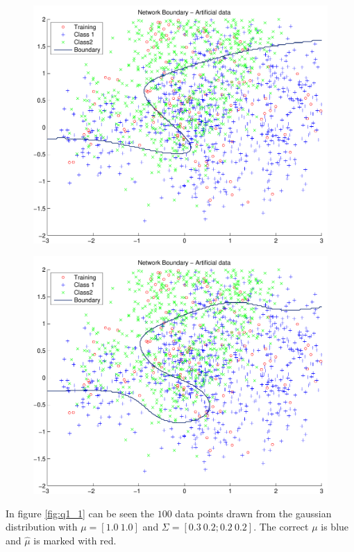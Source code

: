 \begin{figure}[!htbp]
  \centering
  \includegraphics[width=1.0\textwidth]{./images/q210a_Nh260}
  \caption{}
  \label{fig:q210Nh260}
\end{figure}

\begin{figure}[!htbp]
  \centering
  \includegraphics[width=1.0\textwidth]{./images/q210a_Nh1000}
  \caption{}
  \label{fig:q210Nh1000}
\end{figure}

In figure \ref{fig:q1_1} can be seen the $100$ data points drawn from
the gaussian distribution with $\mu = [1.0~ 1.0]$ and $\Sigma = [0.3~
  0.2; 0.2~ 0.2]$. The correct $\mu$ is blue and $\widehat{\mu}$ is
marked with red.


